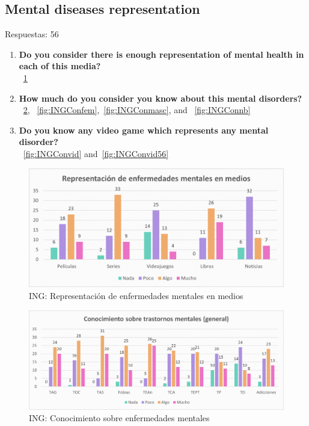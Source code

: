 \documentclass[12pt, a4paper,twoside,titlepage]{book}
\begin{document}
\subsection{Mental diseases representation}
Respuestas: 56
\begin{enumerate}[label=\textbf{\arabic*}.]
     \item \textbf{Do you consider there is enough representation of mental health in each of this media?}\\
    ~\ref{fig:INGMedios}
     \item \textbf{How much do you consider you know about this mental disorders?}\\
    ~\ref{fig:INGCon}, ~\ref{fig:INGConfem},~\ref{fig:INGConmasc}, and
    ~\ref{fig:INGConnb}
     \item \textbf{Do you know any video game which represents any mental disorder?}\\
     ~\ref{fig:INGConvid} and~\ref{fig:INGConvid56}
\end{enumerate}




\begin{figure}
    \centering
    \includegraphics[width=1\linewidth]{ANEXO ING/7AnexINGMedios}
    \caption{ING: Representación de enfermedades mentales en medios}
    \label{fig:INGMedios}
\end{figure}


\begin{figure}
    \centering
    \includegraphics[width=1\linewidth]{ANEXO ING/8AnexINGCon}
    \caption{ING: Conocimiento sobre enfermedades mentales}
    \label{fig:INGCon}
\end{figure}
\end{document}
